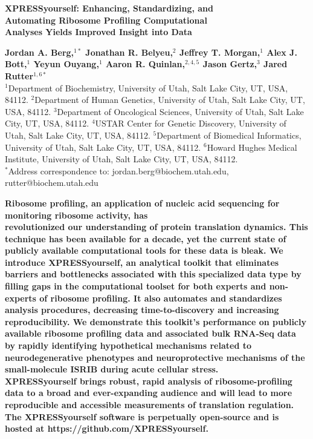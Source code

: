 \documentclass[10pt, oneside]{article}
\date{}
\begin{document}
\noindent
{\huge
\textbf{XPRESSyourself: Enhancing, Standardizing, and \\
Automating Ribosome Profiling Computational \\
Analyses Yields Improved Insight into Data
}
}

\bigskip


\noindent
{\large
\textbf{Jordan A. Berg,$^{1\ast}$ Jonathan R. Belyeu,$^{2}$ Jeffrey T. Morgan,$^{1}$ Alex J. Bott,$^{1}$ Yeyun Ouyang,$^{1}$ Aaron R. Quinlan,$^{2,4,5}$ Jason Gertz,$^{3}$ Jared Rutter$^{1,6\ast}$
}
} \\

\noindent
{$^{1}$Department of Biochemistry, University of Utah, Salt Lake City, UT, USA, 84112.}
{$^{2}$Department of Human Genetics, University of Utah, Salt Lake City, UT, USA, 84112.}
{$^{3}$Department of Oncological Sciences, University of Utah, Salt Lake City, UT, USA, 84112.}
{$^{4}$USTAR Center for Genetic Discovery, University of Utah, Salt Lake City, UT, USA, 84112.}
{$^{5}$Department of Biomedical Informatics, University of Utah, Salt Lake City, UT, USA, 84112.}
{$^{6}$Howard Hughes Medical Institute, University of Utah, Salt Lake City, UT, USA, 84112.}\\
{$^\ast$Address correspondence to: jordan.berg@biochem.utah.edu, rutter@biochem.utah.edu}

\bigskip

\noindent
\textbf{Ribosome profiling, an application of nucleic acid sequencing for monitoring ribosome activity, has \\revolutionized our understanding of protein translation dynamics. This technique has been available for a decade, yet the current state of publicly available computational tools for these data is bleak. We introduce XPRESSyourself, an analytical toolkit that eliminates barriers and bottlenecks associated with this specialized data type by filling gaps in the computational toolset for both experts and non-experts of ribosome profiling. It also automates and standardizes analysis procedures, decreasing time-to-discovery and increasing \\reproducibility. We demonstrate this toolkit's performance on publicly available ribosome profiling data and associated bulk RNA-Seq data by rapidly identifying hypothetical mechanisms related to neurodegenerative phenotypes and neuroprotective mechanisms of the small-molecule ISRIB during acute cellular stress. \\XPRESSyourself brings robust, rapid analysis of ribosome-profiling data to a broad and ever-expanding audience and will lead to more reproducible and accessible measurements of translation regulation. The XPRESSyourself software is perpetually open-source and is hosted at https://github.com/XPRESSyourself.
}
\end{document}
